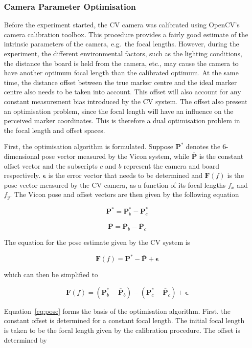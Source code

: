 \subsubsection{Camera Parameter Optimisation}
\label{sec:focal-optimisation}

Before the experiment started, the CV camera was calibrated using OpenCV's camera calibration toolbox. This procedure provides a fairly good estimate of the intrinsic parameters of the camera, e.g.\ the focal lengths. However, during the experiment, the different environmental factors, such as the lighting conditions, the distance the board is held from the camera, etc., may cause the camera to have another optimum focal length than the calibrated optimum. At the same time, the distance offset between the true marker centre and the ideal marker centre also needs to be taken into account. This offset will also account for any constant measurement bias introduced by the CV system. The offset also present an optimisation problem, since the focal length will have an influence on the perceived marker coordinates. This is therefore a dual optimisation problem in the focal length and offset spaces.   

First, the optimisation algorithm is formulated. Suppose $\bm{P}^*$ denotes the 6-dimensional pose vector measured by the Vicon system, while $\bar{\bm{P}}$ is the constant offset vector and the subscripts $c$ and $b$ represent the camera and board respectively. $\bm{\epsilon}$ is the error vector that needs to be determined and $\bm{F}(f)$ is the pose vector measured by the CV camera, as a function of its focal lengths $f_x$ and $f_y$. The Vicon pose and offset vectors are then given by the following equation

\[
  \bm{P}^* = \bm{P}^*_b - \bm{P}^*_c
\]

\[
  \bar{\bm{P}} = \bar{\bm{P}}_b - \bar{\bm{P}}_c
\]

The equation for the pose estimate given by the CV system is 

\[
  \bm{F}(f) = \bm{P}^* - \bar{\bm{P}} + \bm{\epsilon}
\]

which can then be simplified to 

\begin{equation}
  \label{eq:pose}
  \bm{F}(f) = (\bm{P}^*_b - \bar{\bm{P}}_b) - (\bm{P}^*_c - \bar{\bm{P}}_c) + \bm{\epsilon}
\end{equation}

Equation~\ref{eq:pose} forms the basis of the optimisation algorithm. First, the constant offset is determined for a constant focal length. The initial focal length is taken to be the focal length given by the calibration procedure. The offset is determined by 

